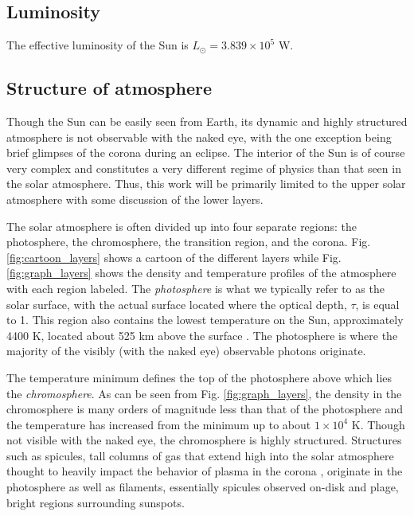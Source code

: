 	\subsection{Luminosity}
	The effective luminosity of the Sun is $L_{\odot} = 3.839\times10^5$ W.
	
	\subsection{Structure of atmosphere}
	Though the Sun can be easily seen from Earth, its dynamic and highly structured atmosphere is not observable with the naked eye, with the one exception being brief glimpses of the corona during an eclipse. The interior of the Sun is of course very complex and constitutes a very different regime of physics than that seen in the solar atmosphere. Thus, this work will be primarily limited to the upper solar atmosphere with some discussion of the lower layers.
	
	The solar atmosphere is often divided up into four separate regions: the photosphere, the chromosphere, the transition region, and the corona. Fig. \ref{fig:cartoon_layers} shows a cartoon of the different layers while Fig. \ref{fig:graph_layers} shows the density and temperature profiles of the atmosphere with each region labeled. The \textit{photosphere} is what we typically refer to as the solar surface, with the actual surface located where the optical depth, $\tau$, is equal to 1. This region also contains the lowest temperature on the Sun, approximately 4400 K, located about 525 km above the surface \citep{carroll_introduction_2007}. The photosphere is where the majority of the visibly (with the naked eye) observable photons originate.

	The temperature minimum defines the top of the photosphere above which lies the \textit{chromosphere}. As can be seen from Fig. \ref{fig:graph_layers}, the density in the chromosphere is many orders of magnitude less than that of the photosphere and the temperature has increased from the minimum up to about $1\times10^4$ K. Though not visible with the naked eye, the chromosphere is highly structured. Structures such as spicules, tall columns of gas that extend high into the solar atmosphere thought to heavily impact the behavior of plasma in the corona \citep{de_pontieu_origins_2011}, originate in the photosphere as well as filaments, essentially spicules observed on-disk and plage, bright regions surrounding sunspots.

